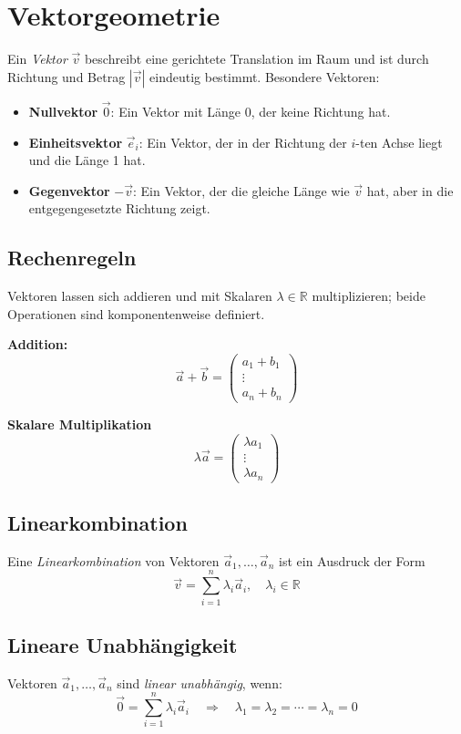 \section{Vektorgeometrie}

Ein \emph{Vektor} $\vec{v}$ beschreibt eine gerichtete Translation im Raum und ist durch Richtung und Betrag $|\vec{v}|$ eindeutig bestimmt. Besondere Vektoren:
\begin{itemize}
     \item \textbf{Nullvektor} \(\vec{0}\): Ein Vektor mit Länge 0, der keine Richtung hat.
     \item \textbf{Einheitsvektor} \(\vec{e}_i\): Ein Vektor, der in der Richtung der \(i\)-ten Achse liegt und die Länge 1 hat.
     \item \textbf{Gegenvektor} \(-\vec{v}\): Ein Vektor, der die gleiche Länge wie \(\vec{v}\) hat, aber in die entgegengesetzte Richtung zeigt.
\end{itemize}


\subsection{Rechenregeln}

Vektoren lassen sich addieren und mit Skalaren $\lambda \in \mathbb{R}$ multiplizieren; beide Operationen sind komponentenweise definiert.

\textbf{Addition:}
\[
     \vec a + \vec b = \begin{pmatrix} a_1 + b_1 \\ \vdots \\ a_n + b_n \end{pmatrix}
\]

\textbf{Skalare Multiplikation}
\[
     \lambda \vec a = \begin{pmatrix} \lambda a_1 \\ \vdots \\ \lambda a_n \end{pmatrix}
\]

\subsection{Linearkombination}
Eine \emph{Linearkombination} von Vektoren $\vec a_1, \ldots, \vec a_n$ ist ein Ausdruck der Form
\[
     \vec v = \sum_{i=1}^{n} \lambda_i \vec a_i, \quad \lambda_i \in \mathbb{R}
\]

\subsection{Lineare Unabhängigkeit}
Vektoren $\vec{a}_1, \ldots, \vec{a}_n$ sind \emph{linear unabhängig}, wenn:
\[
     \vec{0} = \sum_{i=1}^{n} \lambda_i \vec{a}_i \quad \Rightarrow \quad \lambda_1 = \lambda_2 = \cdots = \lambda_n = 0
\]

